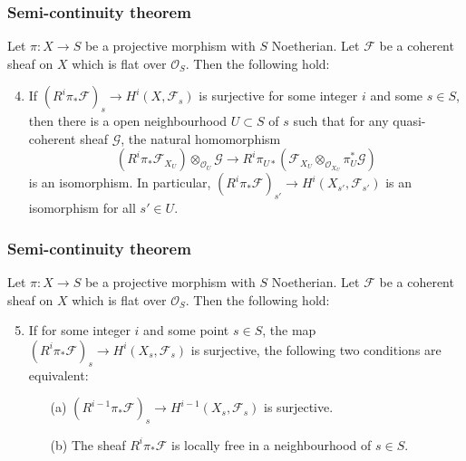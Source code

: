 \documentclass[ignorenonframetext,t]{beamer}
\newcommand{\sF}{{\mathcal F}}
\newcommand{\sG}{{\mathcal G}}
\newcommand{\sO}{{\mathcal O}}
\theoremstyle{definition}
\begin{document}
\begin{frame}
	\frametitle{Semi-continuity theorem}
	
	\begin{theorem}
		Let $\pi: X\rightarrow S$ be a projective morphism with $S$ Noetherian. Let $\sF$ be a coherent sheaf on $X$ which is flat over $\sO_S$. Then the following hold:
		\begin{enumerate}
			\setcounter{enumi}{3}
			\item If $(R^i\pi_*\sF)_s\rightarrow H^i(X,\sF_s)$ is surjective for some integer $i$ and some $s\in S$, then there is a open neighbourhood $U\subset S$ of $s$ such that for any quasi-coherent sheaf $\sG$, the natural homomorphism
			\[(R^i\pi_*\sF_{X_U})\otimes_{\sO_U}\sG \rightarrow R^i\pi_{U*}(\sF_{X_U}\otimes_{\sO_{X_U}} \pi_U^*\sG)\]
			is an isomorphism. In particular, $(R^i\pi_*\sF)_{s'}\rightarrow H^i(X_{s'},\sF_{s'})$ is an isomorphism for all $s'\in U$.
			
		\end{enumerate}
	\end{theorem}
	
\end{frame}


\begin{frame}
	\frametitle{Semi-continuity theorem}
	
	\begin{theorem}
		Let $\pi: X\rightarrow S$ be a projective morphism with $S$ Noetherian. Let $\sF$ be a coherent sheaf on $X$ which is flat over $\sO_S$. Then the following hold:
		\begin{enumerate}
			\setcounter{enumi}{4}
			\item If for some integer $i$ and some point $s\in S$, the map $(R^i\pi_*\sF)_s\rightarrow H^i(X_s,\sF_s)$ is surjective, the following two conditions are equivalent:
			\begin{itemize}
				\item[(a)] $(R^{i-1}\pi_*\sF)_s\rightarrow H^{i-1}(X_s,\sF_s)$ is surjective.
				\item[(b)] The sheaf $R^i\pi_*\sF$ is locally free in a neighbourhood of $s\in S$.
			\end{itemize}
		\end{enumerate}
	\end{theorem}
	
\end{frame}
\end{document}
